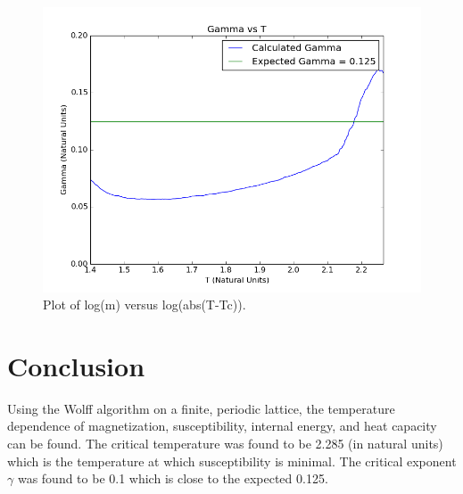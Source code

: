 \documentclass[10pt]{article}
\newcommand{\n}{\noindent}
\begin{document}
\begin{figure}[H]
\centering
\begin{minipage}{.75\textwidth}
\centering
\includegraphics[width= \linewidth]{log_mag_v_log_tmtc.png}
\end{minipage}\hfill
\caption{Plot of log(m) versus log(abs(T-Tc)).}
\label{fig:figure5}
\end{figure}
\n

\section{Conclusion}
Using the Wolff algorithm on a finite, periodic lattice, the temperature dependence of magnetization, susceptibility, internal energy, and heat capacity can be found.  The critical temperature was found to be 2.285 (in natural units) which is the temperature at which susceptibility is minimal.  The critical exponent $\gamma$ was found to be 0.1 which is close to the expected 0.125.

	
\end{document}
